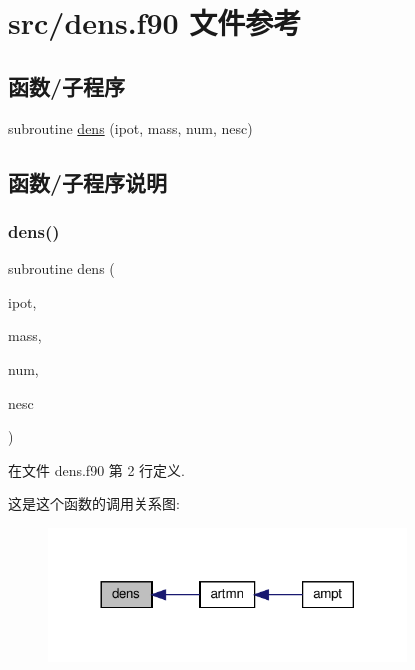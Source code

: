 \hypertarget{dens_8f90}{}\section{src/dens.f90 文件参考}
\label{dens_8f90}
\subsection*{函数/子程序}
\begin{DoxyCompactItemize}
\item 
subroutine \mbox{\hyperlink{dens_8f90_a52940d7fe7523529de522f0aa67842a8}{dens}} (ipot, mass, num, nesc)
\end{DoxyCompactItemize}


\subsection{函数/子程序说明}
\mbox{\label{dens_8f90_a52940d7fe7523529de522f0aa67842a8}} 
\subsubsection{\texorpdfstring{dens()}{dens()}}
{\footnotesize\ttfamily subroutine dens (\begin{DoxyParamCaption}\item[{}]{ipot,  }\item[{}]{mass,  }\item[{}]{num,  }\item[{}]{nesc }\end{DoxyParamCaption})}



在文件 dens.\+f90 第 2 行定义.

这是这个函数的调用关系图\+:
\nopagebreak
\begin{figure}[H]
\begin{center}
\leavevmode
\includegraphics[width=269pt]{dens_8f90_a52940d7fe7523529de522f0aa67842a8_icgraph}
\end{center}
\end{figure}
